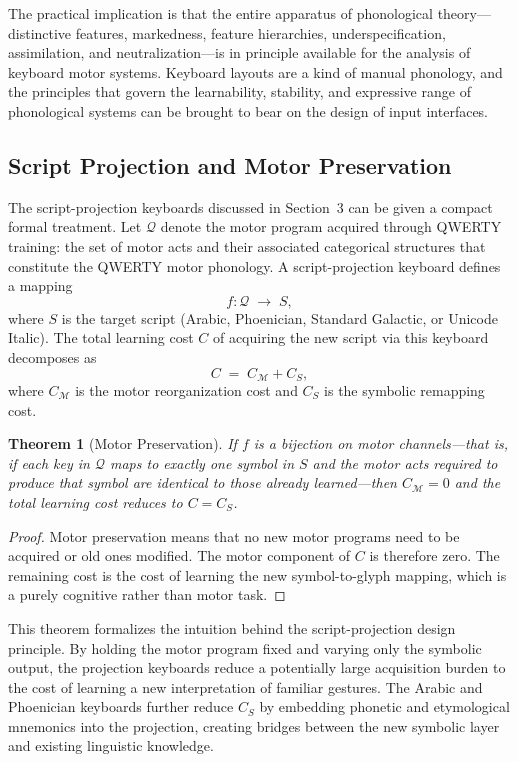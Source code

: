 \documentclass[12pt,a4paper]{article}
\theoremstyle{plain}
\newtheorem{theorem}{Theorem}
\theoremstyle{definition}
\theoremstyle{remark}
\begin{document}
The practical implication is that the entire apparatus of phonological theory---
distinctive features, markedness, feature hierarchies, underspecification,
assimilation, and neutralization---is in principle available for the analysis
of keyboard motor systems. Keyboard layouts are a kind of manual phonology,
and the principles that govern the learnability, stability, and expressive
range of phonological systems can be brought to bear on the design of input
interfaces.

\subsection{Script Projection and Motor Preservation}

The script-projection keyboards discussed in Section~3 can be given a compact
formal treatment. Let $\mathcal{Q}$ denote the motor program acquired through
QWERTY training: the set of motor acts and their associated categorical
structures that constitute the QWERTY motor phonology. A script-projection
keyboard defines a mapping
\[
  f : \mathcal{Q} \;\to\; S,
\]
where $S$ is the target script (Arabic, Phoenician, Standard Galactic, or
Unicode Italic). The total learning cost $C$ of acquiring the new script via
this keyboard decomposes as
\[
  C \;=\; C_{\mathcal{M}} + C_S,
\]
where $C_{\mathcal{M}}$ is the motor reorganization cost and $C_S$ is the
symbolic remapping cost.

\begin{theorem}[Motor Preservation]
If $f$ is a bijection on motor channels---that is, if each key in $\mathcal{Q}$
maps to exactly one symbol in $S$ and the motor acts required to produce that
symbol are identical to those already learned---then $C_{\mathcal{M}} = 0$
and the total learning cost reduces to $C = C_S$.
\end{theorem}

\begin{proof}
Motor preservation means that no new motor programs need to be acquired or
old ones modified. The motor component of $C$ is therefore zero. The remaining
cost is the cost of learning the new symbol-to-glyph mapping, which is a
purely cognitive rather than motor task. \end{proof}

This theorem formalizes the intuition behind the script-projection design
principle. By holding the motor program fixed and varying only the symbolic
output, the projection keyboards reduce a potentially large acquisition burden
to the cost of learning a new interpretation of familiar gestures. The Arabic
and Phoenician keyboards further reduce $C_S$ by embedding phonetic and
etymological mnemonics into the projection, creating bridges between the new
symbolic layer and existing linguistic knowledge.
\end{document}
